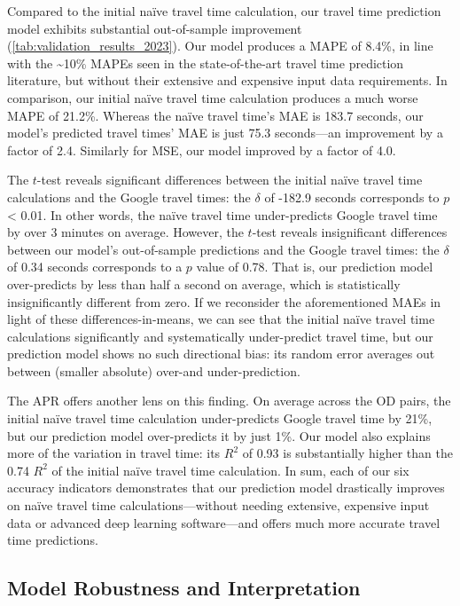 \documentclass[12pt,letterpaper]{article} %
\begin{document}
Compared to the initial naïve travel time calculation, our travel time prediction model exhibits substantial out-of-sample improvement (\autoref{tab:validation_results_2023}). Our model produces a MAPE of 8.4\%, in line with the \textasciitilde10\% MAPEs seen in the state-of-the-art travel time prediction literature, but without their extensive and expensive input data requirements. In comparison, our initial naïve travel time calculation produces a much worse MAPE of 21.2\%. Whereas the naïve travel time's MAE is 183.7 seconds, our model's predicted travel times' MAE is just 75.3 seconds---an improvement by a factor of 2.4. Similarly for MSE, our model improved by a factor of 4.0.

The $t$-test reveals significant differences between the initial naïve travel time calculations and the Google travel times: the $\delta$ of -182.9 seconds corresponds to $p$ < 0.01. In other words, the naïve travel time under-predicts Google travel time by over 3 minutes on average. However, the $t$-test reveals insignificant differences between our model's out-of-sample predictions and the Google travel times: the $\delta$ of 0.34 seconds corresponds to a $p$ value of 0.78. That is, our prediction model over-predicts by less than half a second on average, which is statistically insignificantly different from zero. If we reconsider the aforementioned MAEs in light of these differences-in-means, we can see that the initial naïve travel time calculations significantly and systematically under-predict travel time, but our prediction model shows no such directional bias: its random error averages out between (smaller absolute) over-and under-prediction.

The APR offers another lens on this finding. On average across the OD pairs, the initial naïve travel time calculation under-predicts Google travel time by 21\%, but our prediction model over-predicts it by just 1\%. Our model also explains more of the variation in travel time: its $R^2$ of 0.93 is substantially higher than the 0.74 $R^2$ of the initial naïve travel time calculation. In sum, each of our six accuracy indicators demonstrates that our prediction model drastically improves on naïve travel time calculations---without needing extensive, expensive input data or advanced deep learning software---and offers much more accurate travel time predictions.

\subsection{Model Robustness and Interpretation}
\end{document}
